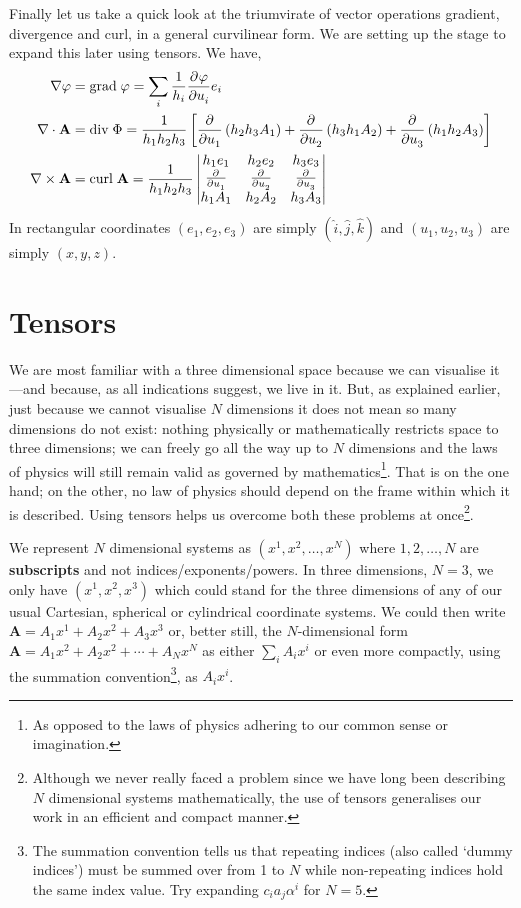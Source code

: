 \documentclass{tufte-handout}
\providecommand*{\pdif}[3][]{\frac{\partial^{#1}#2}{\partial #3^{#1}}}
\begin{document}
Finally let us take a quick look at the triumvirate of vector operations gradient, divergence and curl, in a general curvilinear form. We are setting up the stage to expand this later using tensors. We have,
\begin{equation}
	\begin{aligned}
		\nabla \varphi &= \textrm{grad}\; \varphi = \sum_i {1\over h_i} \pdif{\varphi}{u_i} e_i \\
		\nabla \cdot \mathbf{A} &= \textrm{div}\; \Phi = {1\over h_1 h_2 h_3} \left[ \pdif{}{u_1}\left(h_2h_3A_1\right) + \pdif{}{u_2}\left(h_3h_1A_2\right) + \pdif{}{u_3}\left(h_1h_2A_3\right)\right] \\
		\nabla \times \mathbf{A} &= \textrm{curl}\; \mathbf{A} = {1\over h_1h_2h_3}
		\begin{vmatrix}
 		h_1 e_1 & h_2 e_2 & h_3 e_3 \\
 		\pdif{}{u_1} & \pdif{}{u_2} & \pdif{}{u_3} \\
 		h_1 A_1 & h_2 A_2 & h_3 A_3
 		\end{vmatrix}
	\end{aligned}
\end{equation}
In rectangular coordinates $(e_1,e_2,e_3)$ are simply $(\hat{i},\hat{j},\hat{k})$ and $(u_1,u_2,u_3)$ are simply $(x,y,z)$.

\section{Tensors}

We are most familiar with a three dimensional space because we can visualise it---and because, as all indications suggest, we live in it. But, as explained earlier, just because we cannot visualise $N$ dimensions it does not mean so many dimensions do not exist: nothing physically or mathematically restricts space to three dimensions; we can freely go all the way up to $N$ dimensions and the laws of physics will still remain valid as governed by mathematics\footnote{As opposed to the laws of physics adhering to our common sense or imagination.}. That is on the one hand; on the other, no law of physics should depend on the frame within which it is described. Using tensors helps us overcome both these problems at once\footnote{Although we never really faced a problem since we have long been describing $N$ dimensional systems mathematically, the use of tensors generalises our work in an efficient and compact manner.}.

We represent $N$ dimensional systems as $(x^1, x^2, \ldots, x^N)$ where $1, 2, \ldots, N$ are \textbf{subscripts} and not indices/exponents/powers. In three dimensions, $N=3$, we only have $(x^1,x^2,x^3)$ which could stand for the three dimensions of any of our usual Cartesian, spherical or cylindrical coordinate systems. We could then write $\mathbf{A} = A_1x^1 + A_2x^2 + A_3x^3$ or, better still, the $N$-dimensional form $\mathbf{A} = A_1x^2 + A_2x^2 + \cdots + A_Nx^N$ as either $\sum_i A_ix^i$ or even more compactly, using the summation convention\footnote{The summation convention tells us that repeating indices (also called `dummy indices') must be summed over from 1 to $N$ while non-repeating indices hold the same index value. Try expanding $c_ia_j\alpha^i$ for $N=5$.}, as $A_ix^i$.
\end{document}
